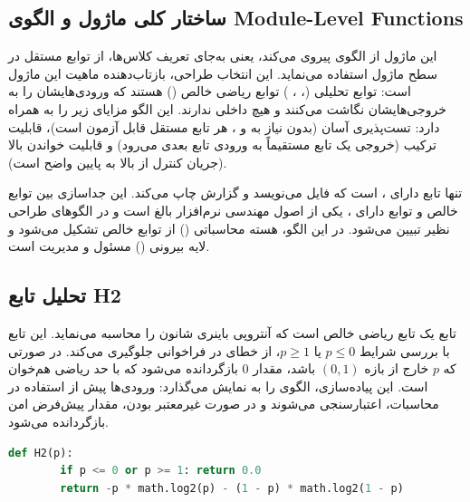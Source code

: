 \subsection{ساختار کلی ماژول و الگوی Module-Level Functions}

این ماژول از الگوی  پیروی می‌کند، یعنی به‌جای تعریف کلاس‌ها، از توابع مستقل در سطح ماژول استفاده می‌نماید. این انتخاب طراحی، بازتاب‌دهنده ماهیت  این ماژول است: توابع تحلیلی (، ، ) توابع ریاضی خالص () هستند که ورودی‌هایشان را به خروجی‌هایشان نگاشت می‌کنند و هیچ  داخلی ندارند. این الگو مزایای زیر را به همراه دارد: تست‌پذیری آسان (بدون نیاز به  و ، هر تابع مستقل قابل آزمون است)، قابلیت ترکیب (خروجی یک تابع مستقیماً به ورودی تابع بعدی می‌رود) و قابلیت خواندن بالا (جریان کنترل از بالا به پایین واضح است).

تنها تابع دارای ،  است که فایل  می‌نویسد و گزارش چاپ می‌کند. این جداسازی بین توابع خالص و توابع دارای ، یکی از اصول مهندسی نرم‌افزار بالغ است و در الگوهای طراحی نظیر  تبیین می‌شود. در این الگو، هسته محاسباتی () از توابع خالص تشکیل می‌شود و لایه بیرونی () مسئول  و مدیریت  است.

\subsection{تحلیل تابع H2}

تابع  یک تابع ریاضی خالص است که آنتروپی باینری شانون را محاسبه می‌نماید. این تابع با بررسی شرایط $p \leq 0$ یا $p \geq 1$، از خطای  در فراخوانی  جلوگیری می‌کند. در صورتی که $p$ خارج از بازه $(0, 1)$ باشد، مقدار $0$ بازگردانده می‌شود که با حد ریاضی هم‌خوان است. این پیاده‌سازی، الگوی  را به نمایش می‌گذارد: ورودی‌ها پیش از استفاده در محاسبات، اعتبارسنجی می‌شوند و در صورت غیرمعتبر بودن، مقدار پیش‌فرض امن بازگردانده می‌شود.

\begin{LTR}
	\begin{lstlisting}[language=Python]
		def H2(p):
		if p <= 0 or p >= 1: return 0.0
		return -p * math.log2(p) - (1 - p) * math.log2(1 - p)
	\end{lstlisting}
\end{LTR}

